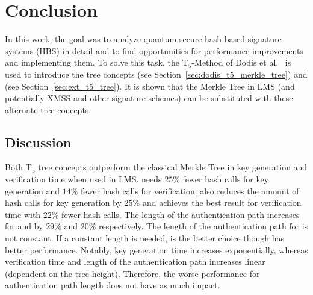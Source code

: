\chapter{Conclusion}
\label{cha:conclusion}
In this work, the goal was to analyze quantum-secure hash-based signature systems (HBS) in detail and to find opportunities for performance improvements and implementing them. 
To solve this task, the T$_5$-Method of Dodis et al.~\cite{T5_paper} is used to introduce the tree concepts \tftree (see Section~\ref{sec:dodis_t5_merkle_tree}) and \extree (see Section~\ref{sec:ext_t5_tree}). 
It is shown that the Merkle Tree in LMS (and potentially XMSS and other signature schemes) can be substituted with these alternate tree concepts.

\section{Discussion}
Both T$_5$ tree concepts outperform the classical Merkle Tree in key generation and verification time when used in LMS. \tftree needs $25\%$ fewer hash calls for key generation and $14\%$ fewer hash calls for verification. \extree also reduces the amount of hash calls for key generation by $25\%$ and achieves the best result for verification time with $22\%$ fewer hash calls.
The length of the authentication path increases for \tftree and \extree by $29\%$ and $20\%$ respectively. The length of the authentication path for \extree is not constant. If a constant length is needed, \tftree is the better choice though \extree has better performance.
Notably, key generation time increases exponentially, whereas verification time and length of the authentication path increases linear (dependent on the tree height). Therefore, the worse performance for authentication path length does not have as much impact. 

